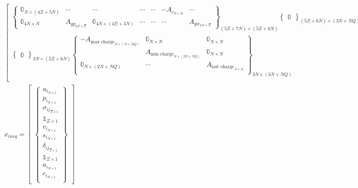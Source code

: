 \documentclass[conference]{IEEEtran}
\begin{document}
\begin{equation}
\begin{array}{c}
\begin{bmatrix}
\begin{Bmatrix}
            \mathbb{0}_{N \times (4\Xi + 5N)}   & \cdots                              & \cdots                              & \cdots                       & \cdots                            & -A_{c_{N \times N}} & \cdots \\
            \mathbb{0}_{4N \times N}            & A_{gp_{4N \times \Xi}}              & \mathbb{0}_{4N \times (4\Xi + 3N)}  & \cdots                       & \cdots                            & \cdots              & A_{gw_{4N \times \Xi}}
        \end{Bmatrix}_{(5\Xi + 7N) \times (5\Xi + 6N)}
        \begin{Bmatrix}
            \mathbb{0}
        \end{Bmatrix}_{(5 \Xi + 6N) \times (3N + NQ)} \\
        \begin{Bmatrix}
            \mathbb{0}
        \end{Bmatrix}_{3N \times (5\Xi + 6N)}
        \begin{Bmatrix}
            -A_{\textrm{max charge}_{N \times (N+NQ)}} & \mathbb{0}_{N \times N}                    & \mathbb{0}_{N \times N}                \\
                                  & A_{\textrm{min charge}_{N \times (2N+NQ)}} & \mathbb{0}_{N \times N}                \\
            \mathbb{0}_{N \times (2N + NQ)}           & \cdots                                     & A_{\textrm{last charge}_{A \times A}} \\
        \end{Bmatrix}_{3N \times (3N + NQ)} \\
    \end{bmatrix} \\
    x_{ineq} =
    \begin{bmatrix}
        \begin{Bmatrix}
            u_{i_{N \times 1}} \\ p_{i_{N \times 1}} \\ \sigma_{ij_{\Xi \times 1}} \\ \mathbb{1}_{\Xi \times 1} \\ v_{i_{N \times 1}} \\ s_{i_{N \times 1}} \\ \delta_{ij_{\Xi \times 1}} \\ \mathbb{1}_{\Xi \times 1} \\ a_{i_{N \times 1}} \\ c_{i_{N \times 1}} \\

\end{Bmatrix}
\end{bmatrix}
\end{array}
\end{equation}
\end{document}
